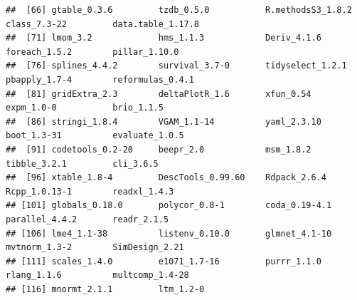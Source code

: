 \documentclass[
  10pt,
]{article}
\begin{document}
\begin{verbatim}
##  [66] gtable_0.3.6         tzdb_0.5.0           R.methodsS3_1.8.2    class_7.3-22         data.table_1.17.8   
##  [71] lmom_3.2             hms_1.1.3            Deriv_4.1.6          foreach_1.5.2        pillar_1.10.0       
##  [76] splines_4.4.2        survival_3.7-0       tidyselect_1.2.1     pbapply_1.7-4        reformulas_0.4.1    
##  [81] gridExtra_2.3        deltaPlotR_1.6       xfun_0.54            expm_1.0-0           brio_1.1.5          
##  [86] stringi_1.8.4        VGAM_1.1-14          yaml_2.3.10          boot_1.3-31          evaluate_1.0.5      
##  [91] codetools_0.2-20     beepr_2.0            msm_1.8.2            tibble_3.2.1         cli_3.6.5           
##  [96] xtable_1.8-4         DescTools_0.99.60    Rdpack_2.6.4         Rcpp_1.0.13-1        readxl_1.4.3        
## [101] globals_0.18.0       polycor_0.8-1        coda_0.19-4.1        parallel_4.4.2       readr_2.1.5         
## [106] lme4_1.1-38          listenv_0.10.0       glmnet_4.1-10        mvtnorm_1.3-2        SimDesign_2.21      
## [111] scales_1.4.0         e1071_1.7-16         purrr_1.1.0          rlang_1.1.6          multcomp_1.4-28     
## [116] mnormt_2.1.1         ltm_1.2-0
\end{verbatim}
\end{document}
